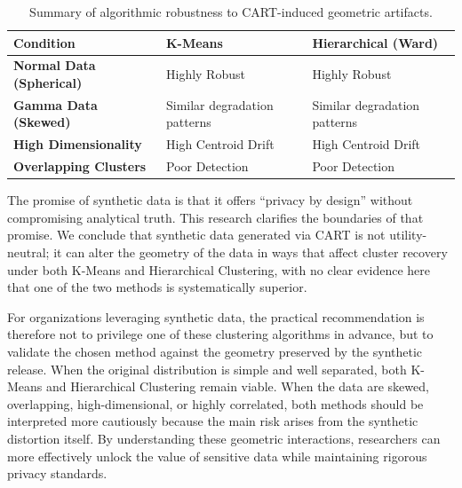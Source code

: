 \begin{table}[H]
  \centering
  \caption[Summary of Algorithmic Robustness to CART Artifacts]{Summary of algorithmic robustness to CART-induced geometric artifacts.}
  \label{tab:robustness_summary}
  \renewcommand{\arraystretch}{1.3}
  \begin{tabular}{@{}lp{4.5cm}p{4.5cm}@{}}
    \toprule
    \textbf{Condition} & \textbf{K-Means} & \textbf{Hierarchical (Ward)} \\ \midrule
    \textbf{Normal Data (Spherical)} & Highly Robust & Highly Robust \\
    \textbf{Gamma Data (Skewed)} & Similar degradation patterns & Similar degradation patterns \\
    \textbf{High Dimensionality} & High Centroid Drift & High Centroid Drift \\
    \textbf{Overlapping Clusters} & Poor Detection & Poor Detection \\ \bottomrule
  \end{tabular}
\end{table}

The promise of synthetic data is that it offers ``privacy by design'' without compromising analytical truth. This research clarifies the boundaries of that promise. We conclude that synthetic data generated via CART is not utility-neutral; it can alter the geometry of the data in ways that affect cluster recovery under both K-Means and Hierarchical Clustering, with no clear evidence here that one of the two methods is systematically superior.

For organizations leveraging synthetic data, the practical recommendation is therefore not to privilege one of these clustering algorithms in advance, but to validate the chosen method against the geometry preserved by the synthetic release. When the original distribution is simple and well separated, both K-Means and Hierarchical Clustering remain viable. When the data are skewed, overlapping, high-dimensional, or highly correlated, both methods should be interpreted more cautiously because the main risk arises from the synthetic distortion itself. By understanding these geometric interactions, researchers can more effectively unlock the value of sensitive data while maintaining rigorous privacy standards.
